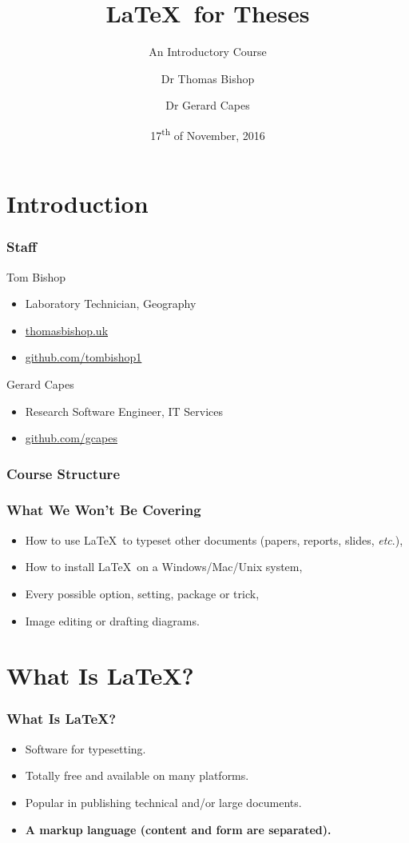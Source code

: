 \documentclass{beamer}
\title{\LaTeX \ for Theses}
\subtitle{An Introductory Course}
\author{Dr Thomas Bishop \and Dr Gerard Capes}
\institute{University of Manchester}
\date{17\textsuperscript{th} of November, 2016}
\begin{document}
\begin{frame}
	\titlepage
\end{frame}

\section{Introduction}

\begin{frame} \frametitle{Staff}
	\begin{block}{Tom Bishop}
			\begin{itemize}
				\item Laboratory Technician, Geography
					\item \url{thomasbishop.uk}
					\item \url{github.com/tombishop1}
			\end{itemize}
		\end{block}
	\begin{block}{Gerard Capes}
		\begin{itemize}
			\item Research Software Engineer, IT Services
			\item \url{github.com/gcapes}
		\end{itemize}
	\end{block}
\end{frame}

\begin{frame}
	\frametitle{Course Structure}
	\tableofcontents
\end{frame}

\begin{frame} \frametitle{What We \textbf{Won't} Be Covering}
	\begin{itemize}
		\item How to use \LaTeX \ to typeset other documents (papers, reports, slides, \textit{etc}.),
		\item How to install \LaTeX \ on a Windows/Mac/Unix system,
		\item Every possible option, setting, package or trick,
		\item Image editing or drafting diagrams.
	\end{itemize}
\end{frame}

\section{What Is \LaTeX?}

\begin{frame} \frametitle{What Is \LaTeX?}
	\begin{itemize}
		\item Software for typesetting.
		\item Totally free and available on many platforms.
		\item Popular in publishing technical and/or large documents.
		\item \textbf{A markup language (content and form are separated).}
	\end{itemize}
\end{frame}
\end{document}
